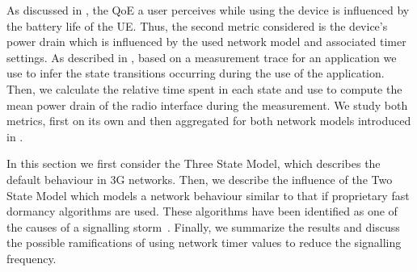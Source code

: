 As discussed in , the \gls{QoE} a user perceives while using the device is influenced by the battery life of the \gls{UE}.
Thus, the second metric considered is the device’s power drain which is influenced by the used network model and associated timer settings.
As described in , based on a measurement trace for an application we use  to infer the state transitions occurring during the use of the application.
Then, we calculate the relative time spent in each state and use  to compute the mean power
drain of the radio interface during the measurement.
We study both metrics, first on its own and then aggregated for both network models introduced in .

In this section we first consider the Three State Model, which describes the default behaviour in \gls{3G} networks. 
Then, we describe the influence of the Two State Model which models a network behaviour similar to that if proprietary fast dormancy algorithms are used.
These algorithms have been identified as one of the causes of a signalling storm~\cite{NSN2011}.
Finally, we summarize the results and discuss the possible ramifications of using network timer values to reduce the signalling frequency.

